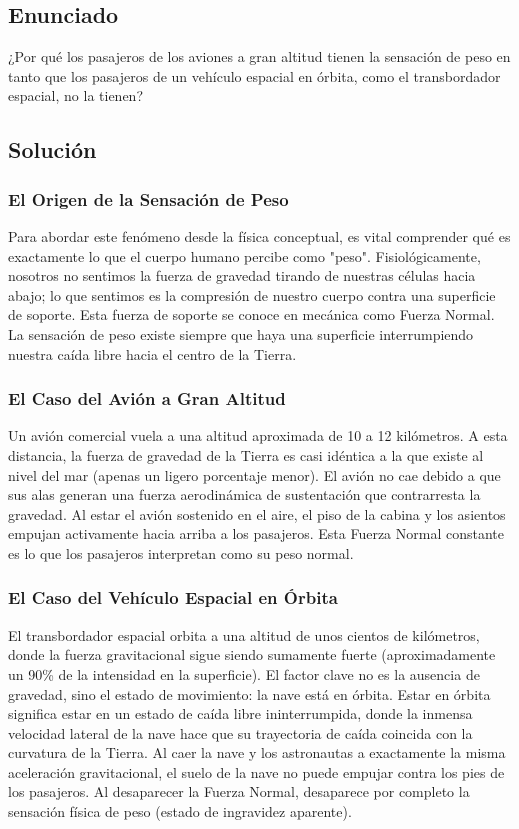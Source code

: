 \documentclass[12pt]{article}
\begin{document}
\newpage

\subsection*{Enunciado}
¿Por qué los pasajeros de los aviones a gran altitud tienen la sensación de peso en tanto que los pasajeros de un vehículo espacial en órbita, como el transbordador espacial, no la tienen?

\subsection*{Solución}

\subsubsection*{El Origen de la Sensación de Peso}
Para abordar este fenómeno desde la física conceptual, es vital comprender qué es exactamente lo que el cuerpo humano percibe como "peso". Fisiológicamente, nosotros no sentimos la fuerza de gravedad tirando de nuestras células hacia abajo; lo que sentimos es la compresión de nuestro cuerpo contra una superficie de soporte. Esta fuerza de soporte se conoce en mecánica como Fuerza Normal. La sensación de peso existe siempre que haya una superficie interrumpiendo nuestra caída libre hacia el centro de la Tierra.

\subsubsection*{El Caso del Avión a Gran Altitud}
Un avión comercial vuela a una altitud aproximada de 10 a 12 kilómetros. A esta distancia, la fuerza de gravedad de la Tierra es casi idéntica a la que existe al nivel del mar (apenas un ligero porcentaje menor). El avión no cae debido a que sus alas generan una fuerza aerodinámica de sustentación que contrarresta la gravedad. Al estar el avión sostenido en el aire, el piso de la cabina y los asientos empujan activamente hacia arriba a los pasajeros. Esta Fuerza Normal constante es lo que los pasajeros interpretan como su peso normal.

\subsubsection*{El Caso del Vehículo Espacial en Órbita}
El transbordador espacial orbita a una altitud de unos cientos de kilómetros, donde la fuerza gravitacional sigue siendo sumamente fuerte (aproximadamente un 90\% de la intensidad en la superficie). El factor clave no es la ausencia de gravedad, sino el estado de movimiento: la nave está en órbita. Estar en órbita significa estar en un estado de caída libre ininterrumpida, donde la inmensa velocidad lateral de la nave hace que su trayectoria de caída coincida con la curvatura de la Tierra.
Al caer la nave y los astronautas a exactamente la misma aceleración gravitacional, el suelo de la nave no puede empujar contra los pies de los pasajeros. Al desaparecer la Fuerza Normal, desaparece por completo la sensación física de peso (estado de ingravidez aparente).
\end{document}
